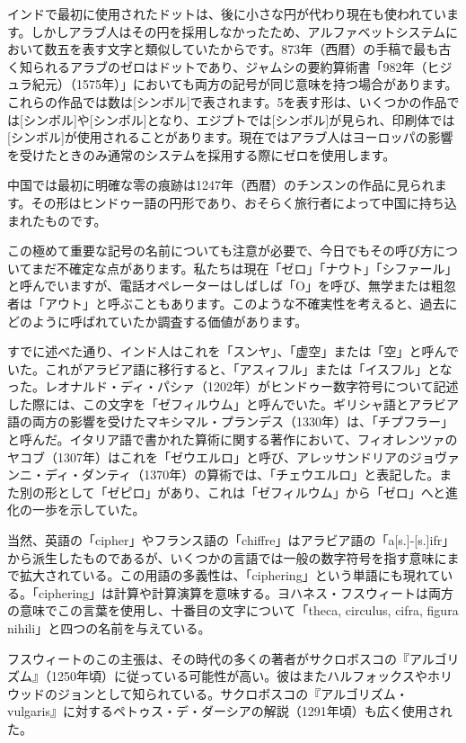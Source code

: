 \documentclass[a4paper,11pt,openany]{ltjsbook}
\begin{document}
インドで最初に使用されたドットは、後に小さな円が代わり現在も使われています。しかしアラブ人はその円を採用しなかったため、アルファベットシステムにおいて数五を表す文字と類似していたからです。873年（西暦）の手稿で最も古く知られるアラブのゼロはドットであり、ジャムシの要約算術書「982年（ヒジュラ紀元）（1575年）」においても両方の記号が同じ意味を持つ場合があります。これらの作品では数は[シンボル]で表されます。5を表す形は、いくつかの作品では[シンボル]や[シンボル]となり、エジプトでは[シンボル]が見られ、印刷体では[シンボル]が使用されることがあります。現在ではアラブ人はヨーロッパの影響を受けたときのみ通常のシステムを採用する際にゼロを使用します。

中国では最初に明確な零の痕跡は1247年（西暦）のチンスンの作品に見られます。その形はヒンドゥー語の円形であり、おそらく旅行者によって中国に持ち込まれたものです。

この極めて重要な記号の名前についても注意が必要で、今日でもその呼び方についてまだ不確定な点があります。私たちは現在「ゼロ」「ナウト」「シファール」と呼んでいますが、電話オペレーターはしばしば「O」を呼び、無学または粗忽者は「アウト」と呼ぶこともあります。このような不確実性を考えると、過去にどのように呼ばれていたか調査する価値があります。

すでに述べた通り、インド人はこれを「スンヤ」、「虚空」または「空」と呼んでいた。これがアラビア語に移行すると、「アスィフル」または「イスフル」となった。レオナルド・ディ・パシァ（1202年）がヒンドゥー数字符号について記述した際には、この文字を「ゼフィルウム」と呼んでいた。ギリシャ語とアラビア語の両方の影響を受けたマキシマル・プランデス（1330年）は、「チプフラー」と呼んだ。イタリア語で書かれた算術に関する著作において、フィオレンツァのヤコブ（1307年）はこれを「ゼウエルロ」と呼び、アレッサンドリアのジョヴァンニ・ディ・ダンティ（1370年）の算術では、「チェウエルロ」と表記した。また別の形として「ゼピロ」があり、これは「ゼフィルウム」から「ゼロ」へと進化の一歩を示していた。

当然、英語の「cipher」やフランス語の「chiffre」はアラビア語の「a[s.]-[s.]ifr」から派生したものであるが、いくつかの言語では一般の数字符号を指す意味にまで拡大されている。この用語の多義性は、「ciphering」という単語にも現れている。「ciphering」は計算や計算演算を意味する。ヨハネス・フスウィートは両方の意味でこの言葉を使用し、十番目の文字について「theca, circulus, cifra, figura nihili」と四つの名前を与えている。

フスウィートのこの主張は、その時代の多くの著者がサクロボスコの『アルゴリズム』（1250年頃）に従っている可能性が高い。彼はまたハルフォックスやホリウッドのジョンとして知られている。サクロボスコの『アルゴリズム・ vulgaris』に対するペトゥス・デ・ダーシアの解説（1291年頃）も広く使用された。
\end{document}
